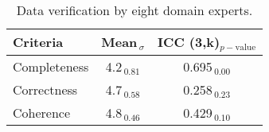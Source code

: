 

\begin{table}
\centering
\caption{Data verification by eight domain experts.}
\label{tab:human_verification}
\begin{tabular}{l|cc} 
\toprule
\textbf{Criteria} & \textbf{Mean$_{~\sigma}$} & \textbf{ICC (3,k)}$_{p-\text{value}}$  \\ 
\hline
Completeness      & 4.2$_{~0.81}$             & 0.695$_{~0.00}$               \\
Correctness       & 4.7$_{~0.58}$             & 0.258$_{~0.23}$               \\
Coherence         & 4.8$_{~0.46}$             & 0.429$_{~0.10}$               \\
\bottomrule
\end{tabular}
\end{table}